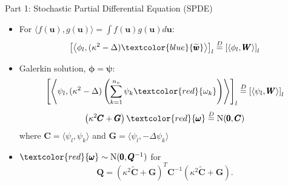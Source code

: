 \documentclass{beamer}
\begin{document}
\begin{frame}{Part 1: Stochastic Partial Differential Equation (SPDE)}{\citep{Lindgren2011}}
\begin{itemize}
\item For $\langle f(\pmb{u}), g(\pmb{u}) \rangle = \int f(\pmb{u}) g(\pmb{u}) d\pmb{u}$:
$$ \left[ \left< \phi_{l}, (\kappa^{2} - \Delta) \textcolor{blue}{\widetilde{\pmb{w}}} \right> \right]_{l}
\overset{D}{=}
\left[ \left< \phi_{l}, \pmb{W} \right> \right]_{l} $$

\item Galerkin solution, $\pmb{\phi} = \pmb{\psi}$:
$$ \left[ \left< \psi_{l}, (\kappa^{2} - \Delta) \left( \sum_{k=1}^{n_{v}} \psi_{k} \textcolor{red}{\omega_{k}} \right) \right> \right]_{l}
\overset{D}{=}
\left[ \langle \psi_{l}, \pmb{W} \rangle \right]_{l} $$
$$ \left(
\kappa^{2} \pmb{C} + \pmb{G} \right) \textcolor{red}{\pmb{\omega}} \overset{D}{=} \text{N}(\pmb{0},\pmb{C})$$
where $\pmb{C} = \langle \psi_{l}, \psi_{k} \rangle$ and $ \pmb{G} = \langle \psi_{l}, - \Delta \psi_{k} \rangle$ \\
\item $\textcolor{red}{\pmb{\omega}} \sim \text{N}(\pmb{0}, \pmb{Q}^{-1})$ for
$$\pmb{Q} = \left( \kappa^{2} \widetilde{\pmb{C}} + \pmb{G} \right)^{T} \pmb{C}^{-1} \left( \kappa^{2} \widetilde{\pmb{C}} + \pmb{G} \right).$$
\end{itemize}
\end{frame}
\end{document}
